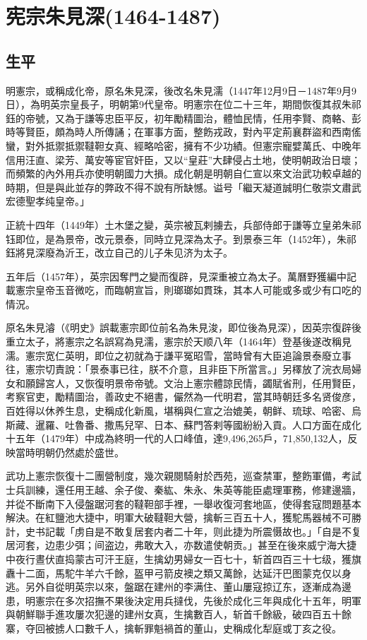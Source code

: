 
\section{宪宗朱見深\tiny(1464-1487)}

\subsection{生平}

明憲宗，或稱成化帝，原名朱見深，後改名朱見濡（1447年12月9日－1487年9月9日），為明英宗皇長子，明朝第9代皇帝。明憲宗在位二十三年，期間恢復其叔朱祁鈺的帝號，又為于謙等忠臣平反，初年勵精圖治，體恤民情，任用李賢、商輅、彭時等賢臣，頗為時人所傳誦；在軍事方面，整飭戎政，對內平定荊襄群盜和西南傜蠻，對外抵禦抵禦韃靼女真、經略哈密，擁有不少功績。但憲宗寵嬖萬氏、中晚年信用汪直、梁芳、萬安等宦官奸臣，又以“皇莊”大肆侵占土地，使明朝政治日壞；而頻繁的內外用兵亦使明朝國力大損。成化朝是明朝自仁宣以來文治武功較卓越的時期，但是與此並存的弊政不得不說有所缺憾。谥号「繼天凝道誠明仁敬崇文肅武宏德聖孝纯皇帝。」

正統十四年（1449年）土木堡之變，英宗被瓦剌擄去，兵部侍郎于謙等立皇弟朱祁钰即位，是為景帝，改元景泰，同時立見深為太子。到景泰三年（1452年），朱祁鈺將見深廢為沂王，改立自己的儿子朱见济为太子。

五年后（1457年），英宗因奪門之變而復辟，見深重被立為太子。萬曆野獲編中記載憲宗皇帝玉音微吃，而臨朝宣旨，則瑯瑯如貫珠，其本人可能或多或少有口吃的情況。

原名朱見濬（《明史》誤載憲宗即位前名為朱見浚，即位後為見深），因英宗復辟後重立太子，將憲宗之名誤寫為見濡，憲宗於天顺八年（1464年）登基後遂改稱見濡。憲宗宽仁英明，即位之初就為于謙平冤昭雪，當時曾有大臣追論景泰廢立事往，憲宗切責說：「景泰事已往，朕不介意，且非臣下所當言。」另䆁放了浣衣局婦女和願歸宮人，又恢復明景帝帝號。文治上憲宗體諒民情，蠲賦省刑，任用賢臣，考察官吏，勵精圖治，善政史不絕書，儼然為一代明君，當其時朝廷多名贤俊彦，百姓得以休养生息，史稱成化新風，堪稱與仁宣之治媲美，朝鲜、琉球、哈密、烏斯藏、暹羅、吐魯番、撒馬兒罕、日本、蘇門答剌等國紛紛入貢。人口方面在成化十五年（1479年）中成為終明一代的人口峰值，達9,496,265戶，71,850,132人，反映當時明朝仍然處於盛世。

武功上憲宗恢復十二團營制度，幾次親閱騎射於西苑，巡查禁軍，整飭軍備，考試士兵訓練，還任用王越、余子俊、秦紘、朱永、朱英等能臣處理軍務，修建邊牆，并從不斷南下入侵盤踞河套的韃靼部手裡，一舉收復河套地區，使得套寇問題基本解決。在紅鹽池大捷中，明軍大破韃靼大營，擒斬三百五十人，獲駝馬器械不可勝計，史书記載「虏自是不敢复居套内者二十年，则此捷为所震慑故也。」「自是不复居河套，边患少弭；间盗边，弗敢大入，亦数遣使朝贡。」甚至在後來威宁海大捷中夜行晝伏直捣蒙古可汗王庭，生擒幼男婦女一百七十，斩首四百三十七级，獲旗纛十二面，馬駝牛羊六千餘，盔甲弓箭皮襖之類又萬餘，达延汗巴图蒙克仅以身逃。另外自從明英宗以來，盤踞在建州的李满住、董山屢寇掠辽东，逐漸成為邊患，明憲宗在多次招撫不果後決定用兵撻伐，先後於成化三年與成化十五年，明軍與朝鮮聯手進攻屢次犯邊的建州女真，生擒數百人，斩首千餘級，破四百五十餘寨，夺回被掳人口數千人，擒斬罪魁禍首的董山，史稱成化犁庭或丁亥之役。

